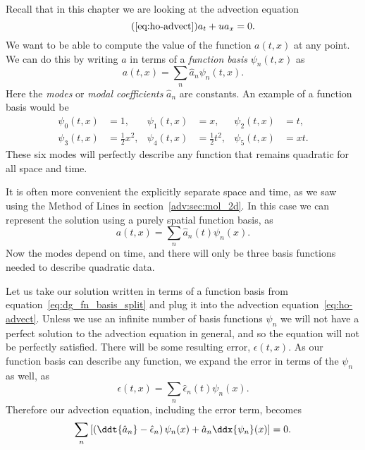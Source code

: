 Recall that in this chapter we are looking at the advection equation
%
\begin{equation}
  \tag{\ref{eq:ho-advect}}
  a_t + u a_x = 0.
\end{equation}
%
We want to be able to compute the value of the function $a(t, x)$ at any point.
We can do this by writing $a$ in terms of a \emph{function basis} $\psi_n(t, x)$
as
%
\begin{equation}
  \label{eq:dg_fn_basis}
  a(t, x) = \sum_n \hat{a}_n \psi_n(t, x).
\end{equation}
%
Here the \emph{modes} or \emph{modal coefficients} $\hat{a}_n$ are constants. An
example of a function basis would be
%
\begin{equation}
  \label{eq:dg_monomial_basis}
  \begin{aligned}
    \psi_{0}(t, x) &= 1, & \psi_{1}(t, x) &= x, & \psi_{2}(t, x) &= t, \\
    \psi_{3}(t, x) &= \tfrac{1}{2} x^2, & \psi_{4}(t, x) &= \tfrac{1}{2} t^2, &
    \psi_{5}(t, x) &= x t.
  \end{aligned}
\end{equation}
%
These six modes will perfectly describe any function that remains quadratic for
all space and time.

It is often more convenient the explicitly separate space and time, as we saw
using the Method of Lines in section~\ref{adv:sec:mol_2d}. In this case we can
represent the solution using a purely spatial function basis, as
%
\begin{equation}
  \label{eq:dg_fn_basis_split}
  a(t, x) = \sum_n \hat{a}_n(t) \psi_n(x).
\end{equation}
%
Now the modes depend on time, and there will only be three basis functions
needed to describe quadratic data.

Let us take our solution written in terms of a function basis from equation~\ref{eq:dg_fn_basis_split}
and plug it into the advection equation~\ref{eq:ho-advect}. Unless we use an
infinite number of basis functions $\psi_n$ we will not have a perfect solution
to the advection equation in general, and so the equation will not be perfectly
satisfied. There will be some resulting error, $\epsilon(t, x)$. As our function
basis can describe any function, we expand the error in terms of the $\psi_n$ as
well, as
%
\begin{equation}
  \label{eq:dg_error}
  \epsilon(t, x) = \sum_n \hat{\epsilon}_n(t) \psi_n(x).
\end{equation}
%
Therefore our advection equation, including the error term, becomes
%
\begin{equation}
  \label{eq:dg_advection}
  \sum_n \left[ \left( \ddt{\hat{a}_n} - \hat{\epsilon}_n \right) \psi_n(x) +
  \hat{a}_n \ddx{\psi_n}(x) \right] = 0.
\end{equation}
%

